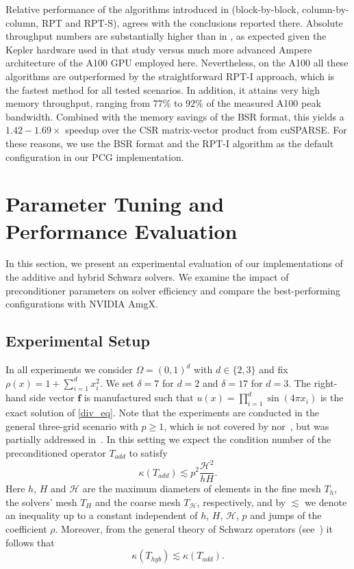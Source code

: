 \documentclass[11pt]{article}
\theoremstyle{definition}
\theoremstyle{theorem}
\begin{document}
Relative performance of the algorithms
introduced in \cite{bsr-mv} (block-by-block, column-by\nobreakdash-column, RPT and RPT-S),
agrees with the conclusions reported there. Absolute throughput numbers
are substantially higher than in \cite{bsr-mv}, as expected given the Kepler
hardware used in that study versus much more advanced Ampere architecture
of the A100 GPU employed here. Nevertheless,
on the A100 all these algorithms are outperformed by the straightforward
RPT\nobreakdash-I approach, which is the fastest method for all tested scenarios.
In addition, it attains very high memory throughput, ranging from $77\%$ to $92\%$
of the measured A100 peak bandwidth. Combined with the memory savings
of the BSR format, this yields a $1.42-1.69\times$ speedup over the
CSR matrix-vector product from cuSPARSE. For these reasons, we use the BSR format
and the RPT-I algorithm as the default configuration in our PCG implementation.

\section{Parameter Tuning and Performance Evaluation}
\label{chap:experiments}

In this section, we present an experimental evaluation of our implementations
of the additive and hybrid Schwarz solvers. We examine the impact of
preconditioner parameters on solver efficiency and compare the
best-performing configurations with NVIDIA AmgX.

\subsection{Experimental Setup}
\label{sec:experimental-setup}

In all experiments we consider $\Omega=(0, 1)^d$ with $d\in \{2, 3\}$ and fix
$\rho(x)=1+\sum_{i=1}^d x_i^2$. We set $\delta=7$ for $d=2$ and $\delta=17$ for $d=3$.
The right-hand side vector $\bm{f}$ is manufactured such that
$u(x)=\prod_{i=1}^d \sin(4\pi x_i)$ is the exact solution of \eqref{div_eq}.
Note that the experiments are conducted in the general three-grid scenario
with $p\geq 1$, which is not covered by \cite{Przykry} nor~\cite{asm-hp-two-meshes},
but was partially addressed in~\cite{Przykry-hp}.
In this setting we expect the condition number of the preconditioned operator
$T_{add}$ to satisfy
\begin{equation}
  \kappa(T_{add})\lesssim p^2\frac{\mathcal{H}^2}{hH}.\label{eq:add-cond-bound}
\end{equation}
Here $h$, $H$ and $\mathcal{H}$ are the maximum diameters of elements in the fine mesh $T_h$,
the solvers' mesh $T_H$ and the coarse mesh $T_{\mathcal{H}}$, respectively, and by $\lesssim$
we denote an inequality up to a constant independent of
$h$, $H$, $\mathcal{H}$, $p$ and jumps of the coefficient $\rho$. Moreover,
from the general theory of Schwarz operators (see~\cite{toselli}) it follows that
\begin{equation}
  \kappa(T_{hyb})\lesssim \kappa(T_{add}).\label{eq:hyb-cond-bound}
\end{equation}
\end{document}
